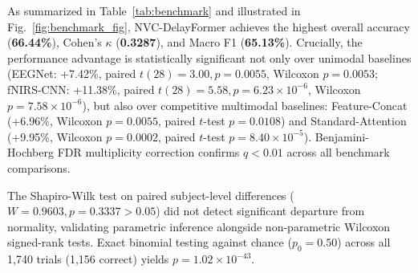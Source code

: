 \documentclass[journal]{IEEEtran}
\begin{document}
\begin{table}[!t]
\caption{29-Fold Full LOSO Benchmark Comparison (Real TU Berlin Cohort, $N=29$ Subjects, 1,740 Real Trials)}
\label{tab:benchmark}
\centering
{}
\end{table}

As summarized in Table~\ref{tab:benchmark} and illustrated in Fig.~\ref{fig:benchmark_fig}, NVC-DelayFormer achieves the highest overall accuracy (\textbf{66.44\%}), Cohen's $\kappa$ (\textbf{0.3287}), and Macro F1 (\textbf{65.13\%}). Crucially, the performance advantage is statistically significant not only over unimodal baselines (EEGNet: +7.42\%, paired $t(28) = 3.00, p = 0.0055$, Wilcoxon $p = 0.0053$; fNIRS-CNN: +11.38\%, paired $t(28) = 5.58, p = 6.23 \times 10^{-6}$, Wilcoxon $p = 7.58 \times 10^{-6}$), but also over competitive multimodal baselines: Feature-Concat (+6.96\%, Wilcoxon $p = 0.0055$, paired $t$-test $p = 0.0108$) and Standard-Attention (+9.95\%, Wilcoxon $p = 0.0002$, paired $t$-test $p = 8.40 \times 10^{-5}$). Benjamini-Hochberg FDR multiplicity correction confirms $q < 0.01$ across all benchmark comparisons.

The Shapiro-Wilk test on paired subject-level differences ($W = 0.9603, p = 0.3337 > 0.05$) did not detect significant departure from normality, validating parametric inference alongside non-parametric Wilcoxon signed-rank tests. Exact binomial testing against chance ($p_0=0.50$) across all 1,740 trials (1,156 correct) yields $p = 1.02 \times 10^{-43}$.
\end{document}
